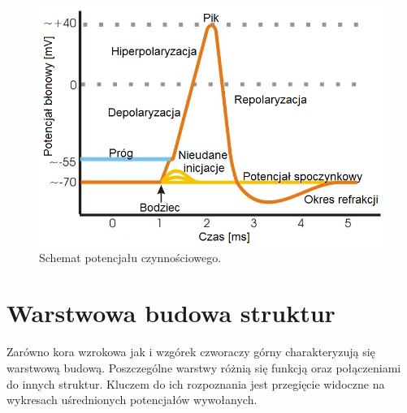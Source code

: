 \documentclass{pracamgr_2}
\begin{document}
\begin{figure}[htbp]
	\begin{center}
		\includegraphics[scale=0.5]{pot_spoczy.png}
	\end{center}
	\caption{Schemat potencjału czynnościowego.}
	\label{rys:pot_spoczy}
\end{figure}
\newpage
\section{Warstwowa budowa struktur}
Zarówno kora wzrokowa jak i wzgórek czworaczy górny charakteryzują się warstwową budową. Poszczególne warstwy różnią się funkcją oraz połączeniami do innych struktur. Kluczem do ich rozpoznania jest przegięcie widoczne na wykresach uśrednionych potencjałów wywołanych.
\end{document}
